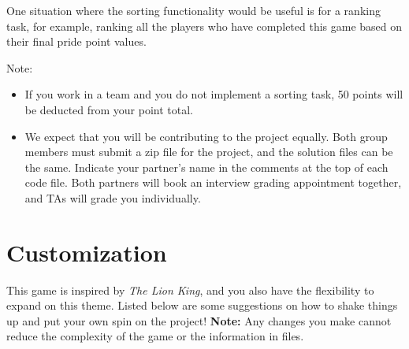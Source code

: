 One situation where the sorting functionality would be useful is for a ranking task, for example, ranking all the players who have completed this game based on their final pride point values. 

Note:
\begin{itemize}
    \item If you work in a team and you do not implement a sorting task, 50 points will be deducted from your point total.
    \item We expect that you will be contributing to the project equally. Both group members must submit a zip file for the project, and the solution files can be the same. Indicate your partner’s name in the comments at the top of each code file. Both partners will book an interview grading appointment together, and TAs will grade you individually.
\end{itemize}



\section{\textbf{Customization}}

This game is inspired by \textit{The Lion King}, and you also have the flexibility to expand on this theme.  Listed below are some suggestions on how to shake things up and put your own spin on the project!
\textbf{Note:} Any changes you make cannot reduce the complexity of the game or the information in files.

